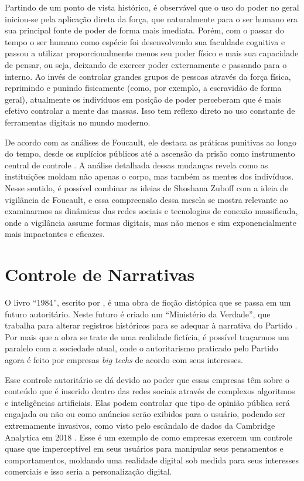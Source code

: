 \documentclass[
	12pt,
	openright,
	twoside,
	a4paper,
	english,
	french,
	spanish,
	brazil
]{abntex2}
\begin{document}
  Partindo de um ponto de vista histórico, é observável que o uso do poder no
  geral iniciou-se pela aplicação direta da força, que naturalmente para o ser
  humano era sua principal fonte de poder de forma mais imediata. Porém, com o
  passar do tempo o ser humano como espécie foi desenvolvendo sua faculdade
  cognitiva e passou a utilizar proporcionalmente menos seu poder físico e mais
  sua capacidade de pensar, ou seja, deixando de exercer poder externamente e
  passando para o interno. Ao invés de controlar grandes grupos de pessoas
  através da força física, reprimindo e punindo fisicamente (como, por exemplo,
  a escravidão de forma geral), atualmente os indivíduos em posição de poder
  perceberam que é mais efetivo controlar a mente das massas. Isso tem reflexo
  direto no uso constante de ferramentas digitais no mundo moderno.

  De acordo com as análises de Foucault, ele destaca as práticas punitivas ao
  longo do tempo, desde os suplícios públicos até a ascensão da prisão como
  instrumento central de controle \cite{foucault-vigiar-punir}. A análise
  detalhada dessas mudanças revela como as instituições moldam não apenas o
  corpo, mas também as mentes dos indivíduos. Nesse sentido, é possível combinar
  as ideias de Shoshana Zuboff com a ideia de vigilância de Foucault, e essa
  compreensão dessa mescla se mostra relevante ao examinarmos as dinâmicas das
  redes sociais e tecnologias de conexão massificada, onde a vigilância assume
  formas digitais, mas não menos e sim exponencialmente mais impactantes e
  eficazes.


  \chapter{Controle de Narrativas}

  O livro ``1984'', escrito por , é uma obra de
  ficção distópica que se passa em um futuro autoritário. Neste futuro é criado
  um ``Ministério da Verdade'', que trabalha para alterar registros históricos
  para se adequar à narrativa do Partido \cite{orwell-1984}. Por mais que a obra
  se trate de uma realidade fictícia, é possível traçarmos um paralelo com a
  sociedade atual, onde o autoritarismo praticado pelo Partido agora é feito por
  empresas \textit{big techs} de acordo com seus interesses.

  Esse controle autoritário se dá devido ao poder que essas empresas têm sobre o
  conteúdo que é inserido dentro das redes sociais através de complexos
  algoritmos e inteligências artificiais. Elas podem controlar que tipo de
  opinião pública será engajada ou não ou como anúncios serão exibidos para o
  usuário, podendo ser extremamente invasivos, como visto pelo escândalo de
  dados da Cambridge Analytica em 2018 \cite{chan-cambridge-analytica}. Esse é
  um exemplo de como empresas exercem um controle quase que imperceptível em
  seus usuários para manipular seus pensamentos e comportamentos, moldando uma
  realidade digital sob medida para seus interesses comerciais e isso seria a
  personalização digital.
\end{document}
